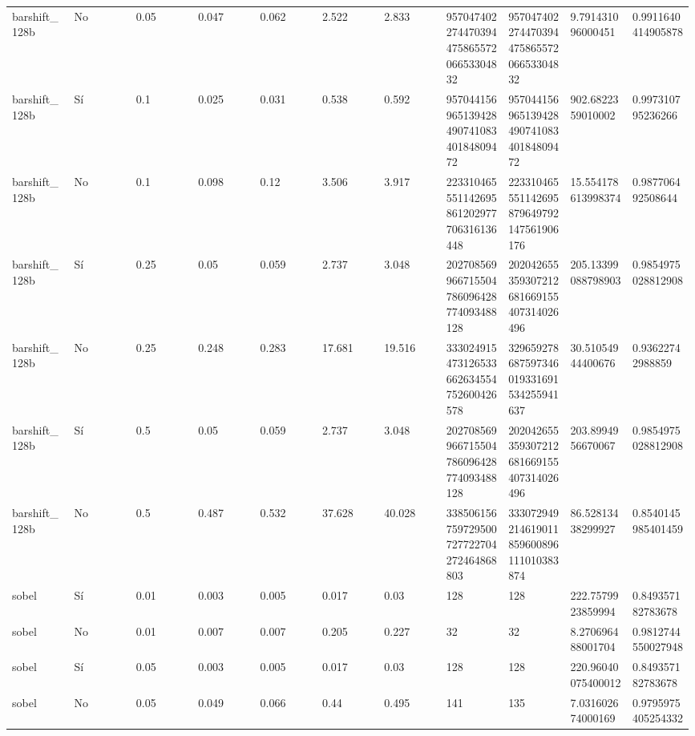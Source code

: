 {{\begin{longtable}{M{0.09\linewidth}M{0.09\linewidth}M{0.09\linewidth}M{0.09\linewidth}M{0.09\linewidth}M{0.09\linewidth}M{0.09\linewidth}M{0.09\linewidth}M{0.09\linewidth}M{0.09\linewidth}M{0.09\linewidth}}
barshift\_128b & No & \num{0.05} & \num{0.047} & \num{0.062} & \num{2.522} & \num{2.833} & \num{95704740227447039447586557206653304832} & \num{95704740227447039447586557206653304832} & \num{9.791431096000451} & \num{0.9911640414905878} \\
barshift\_128b & Sí & \num{0.1} & \num{0.025} & \num{0.031} & \num{0.538} & \num{0.592} & \num{95704415696513942849074108340184809472} & \num{95704415696513942849074108340184809472} & \num{902.6822359010002} & \num{0.997310795236266} \\
barshift\_128b & No & \num{0.1} & \num{0.098} & \num{0.12} & \num{3.506} & \num{3.917} & \num{223310465551142695861202977706316136448} & \num{223310465551142695879649792147561906176} & \num{15.554178613998374} & \num{0.987706492508644} \\
barshift\_128b & Sí & \num{0.25} & \num{0.05} & \num{0.059} & \num{2.737} & \num{3.048} & \num{202708569966715504786096428774093488128} & \num{202042655359307212681669155407314026496} & \num{205.13399088798903} & \num{0.9854975028812908} \\
barshift\_128b & No & \num{0.25} & \num{0.248} & \num{0.283} & \num{17.681} & \num{19.516} & \num{333024915473126533662634554752600426578} & \num{329659278687597346019331691534255941637} & \num{30.51054944400676} & \num{0.93622742988859} \\
barshift\_128b & Sí & \num{0.5} & \num{0.05} & \num{0.059} & \num{2.737} & \num{3.048} & \num{202708569966715504786096428774093488128} & \num{202042655359307212681669155407314026496} & \num{203.8994956670067} & \num{0.9854975028812908} \\
barshift\_128b & No & \num{0.5} & \num{0.487} & \num{0.532} & \num{37.628} & \num{40.028} & \num{338506156759729500727722704272464868803} & \num{333072949214619011859600896111010383874} & \num{86.52813438299927} & \num{0.8540145985401459} \\
sobel & Sí & \num{0.01} & \num{0.003} & \num{0.005} & \num{0.017} & \num{0.03} & \num{128} & \num{128} & \num{222.7579923859994} & \num{0.849357182783678} \\
sobel & No & \num{0.01} & \num{0.007} & \num{0.007} & \num{0.205} & \num{0.227} & \num{32} & \num{32} & \num{8.270696488001704} & \num{0.9812744550027948} \\
sobel & Sí & \num{0.05} & \num{0.003} & \num{0.005} & \num{0.017} & \num{0.03} & \num{128} & \num{128} & \num{220.96040075400012} & \num{0.849357182783678} \\
sobel & No & \num{0.05} & \num{0.049} & \num{0.066} & \num{0.44} & \num{0.495} & \num{141} & \num{135} & \num{7.031602674000169} & \num{0.9795975405254332} \\

\end{longtable}}}
